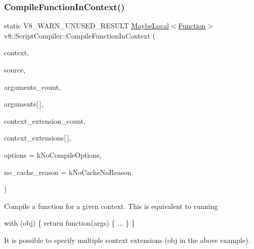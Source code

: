 \subsubsection{\texorpdfstring{Compile\+Function\+In\+Context()}{CompileFunctionInContext()}}
{\footnotesize\ttfamily static V8\+\_\+\+W\+A\+R\+N\+\_\+\+U\+N\+U\+S\+E\+D\+\_\+\+R\+E\+S\+U\+LT \mbox{\hyperlink{classv8_1_1MaybeLocal}{Maybe\+Local}}$<$\mbox{\hyperlink{classv8_1_1Function}{Function}}$>$ v8\+::\+Script\+Compiler\+::\+Compile\+Function\+In\+Context (\begin{DoxyParamCaption}\item[{\mbox{\hyperlink{classv8_1_1Local}{Local}}$<$ Context $>$}]{context,  }\item[{\mbox{\hyperlink{classv8_1_1ScriptCompiler_1_1Source}{Source}} $\ast$}]{source,  }\item[{size\+\_\+t}]{arguments\+\_\+count,  }\item[{\mbox{\hyperlink{classv8_1_1Local}{Local}}$<$ \mbox{\hyperlink{classv8_1_1String}{String}} $>$}]{arguments\mbox{[}$\,$\mbox{]},  }\item[{size\+\_\+t}]{context\+\_\+extension\+\_\+count,  }\item[{\mbox{\hyperlink{classv8_1_1Local}{Local}}$<$ \mbox{\hyperlink{classv8_1_1Object}{Object}} $>$}]{context\+\_\+extensions\mbox{[}$\,$\mbox{]},  }\item[{Compile\+Options}]{options = {\ttfamily kNoCompileOptions},  }\item[{\mbox{\hyperlink{classv8_1_1ScriptCompiler_a7f13fa15484cfc500ae51927756e0d60}{No\+Cache\+Reason}}}]{no\+\_\+cache\+\_\+reason = {\ttfamily kNoCacheNoReason} }\end{DoxyParamCaption})\hspace{0.3cm}{\ttfamily [static]}}

Compile a function for a given context. This is equivalent to running

with (obj) \{ return function(args) \{ ... \} \}

It is possible to specify multiple context extensions (obj in the above example). \mbox{\label{classv8_1_1ScriptCompiler_a7a735ad28cd9925ef67c57a76422116c}} 
